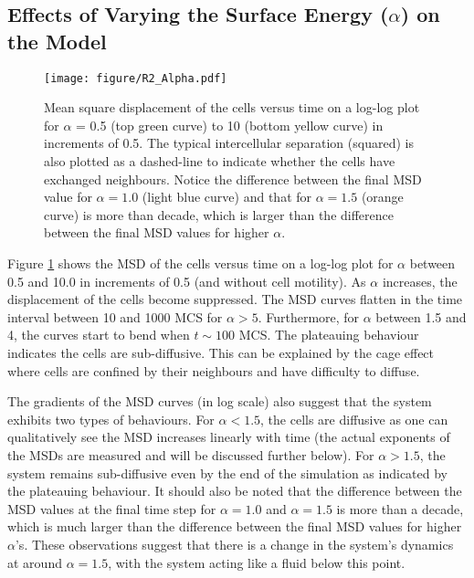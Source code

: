\documentclass[a4paper,12pt]{article}
\begin{document}
\subsection{Effects of Varying the Surface Energy ($\alpha$) on the Model}
\label{sec:varyalphaeffects}
\begin{figure}[h]
\centering
\texttt{[image: figure/R2\_Alpha.pdf]}
\caption{Mean square displacement of the cells versus time on a log-log plot for $\alpha$ = 0.5 (top green curve) to 10 (bottom yellow curve) in increments of 0.5. The typical intercellular separation (squared) is also plotted as a dashed-line to indicate whether the cells have exchanged neighbours. Notice the difference between the final MSD value for $\alpha = 1.0$ (light blue curve) and that for  $\alpha = 1.5$ (orange curve) is more than decade, which is larger than the difference between the final MSD values for higher $\alpha$.
}
\label{fig:r2alpha}
\end{figure}
Figure \ref{fig:r2alpha} shows the MSD of the cells versus time on a log-log plot for $\alpha$ between 0.5 and 10.0 in increments of 0.5 (and without cell motility). As $\alpha$ increases, the displacement of the cells become suppressed. The MSD curves flatten in the time interval between 10 and 1000 MCS for $\alpha > 5$. Furthermore, for $\alpha$ between 1.5 and 4, the curves start to bend when $t \sim 100$ MCS. The plateauing behaviour indicates the cells are sub-diffusive. This can be explained by the cage effect where cells are confined by their neighbours and have difficulty to diffuse. 

The gradients of the MSD curves (in log scale) also suggest that the system exhibits two types of behaviours. For $\alpha < 1.5$, the cells are diffusive as one can qualitatively see the MSD increases linearly with time (the actual exponents of the MSDs are measured and will be discussed further below). For $\alpha > 1.5$, the system remains sub-diffusive even by the end of the simulation as indicated by the plateauing behaviour. It should also be noted that the difference between the MSD values at the final time step for $\alpha = 1.0$ and $\alpha = 1.5$ is more than a decade, which is much larger than the difference between the final MSD values for higher $\alpha$'s. These observations suggest that there is a change in the system's dynamics at around $\alpha = 1.5$, with the system acting like a fluid below this point. 
\end{document}
